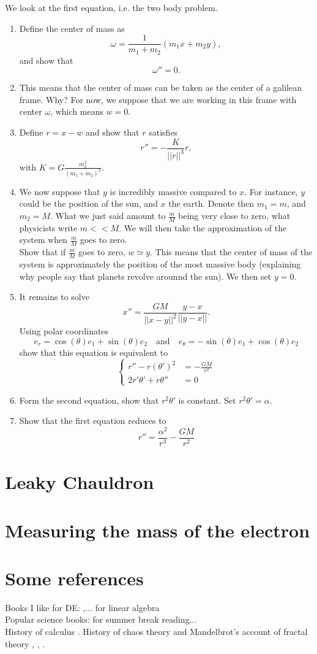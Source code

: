 We look at the first equation, i.e. the two body problem.
\begin{enumerate}
\item Define the center of mass as 
\[ \omega = \frac{1}{m_1+m_2}(m_1 x + m_2 y),\]
and show that \[ \omega'' = 0 . \]
\item This means that the center of mass can be taken as the center of a galilean frame. Why? For now, we suppose that we are working in this frame with center $\omega$, which means $w=0$. 
\item Define $r = x-w$ and show that $r$ satisfies \[ r'' = -\frac{K}{||r||^3}r,\] with $K = G\frac{m_2^3}{(m_1+m_2)^2}$.
\item We now suppose that $y$ is incredibly massive compared to $x$. For instance, $y$ could be the position of the sun, and $x$ the earth. Denote then $m_1 = m$, and $m_2 = M$. What we just said amount to $\frac{m}{M}$ being very close to zero, what physicists write $m << M$. We will then take the approximation of the system when $\frac{m}{M}$ goes to zero.  \\
Show that if $\frac{m}{M}$ goes to zero, $w \simeq y$. This means that the center of mass of the system is approximately the position of the most massive body (explaining why people say that planets revolve arounnd the sun). We then set $y=0$.
\item It remains to solve \[x'' = \frac{GM}{||x-y||^2}\frac{y-x}{||y-x||}.\] 
Using polar coordinates \[e_r = \cos (\theta) e_1 + \sin (\theta)e_2 \quad \text{and}\quad e_\theta  = -\sin (\theta) e_1 + \cos (\theta)e_2\]
show that this equation is equivalent to 
\[\left\{\begin{split}
r''-r(\theta')^2 & = -\frac{GM}{r^2} 	\\ 
2 r' \theta' + r\theta''  & = 0 
\end{split}\right.\]
\item Form the second equation, show that $r^2 \theta' $ is constant. Set $r^2 \theta'  = \alpha$.
\item Show that the first equation reduces to 
\[ r'' = \frac{\alpha^2}{r^3}-\frac{GM}{r^2}\]
\end{enumerate}

\section{Leaky Chauldron}
\section{Measuring the mass of the electron}
\section{Some references}

Books I like for DE: \cite{hubbardwest},... for linear algebra \cite{MneimneReduction}\\

Popular science books: for summer break reading...\\
History of calculus \cite{alexander}. History of chaos theory \cite{Stuart} and Mandelbrot's account of fractal theory \cite{MandelbrotFractals}, \cite{MandelbrotLong} , \cite{MandelbrotFinance}.
